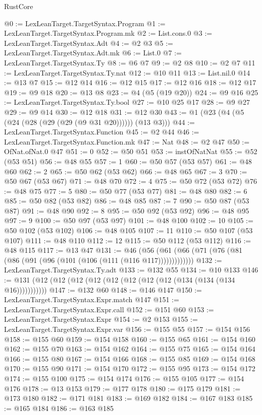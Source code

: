 \begin{lexlean}{RustCore}
\begin{coremodule}
@0 := LexLeanTarget.TargetSyntax.Program
@1 := LexLeanTarget.TargetSyntax.Program.mk
@2 := List.cons.{0}
@3 := LexLeanTarget.TargetSyntax.Adt
@4 := @2 @3
@5 := LexLeanTarget.TargetSyntax.Adt.mk
@6 := List.{0}
@7 := LexLeanTarget.TargetSyntax.Ty
@8 := @6 @7
@9 := @2 @8
@10 := @2 @7
@11 := LexLeanTarget.TargetSyntax.Ty.nat
@12 := @10 @11
@13 := List.nil.{0}
@14 := @13 @7
@15 := @12 @14
@16 := @12 @15
@17 := @12 @16
@18 := @12 @17
@19 := @9 @18
@20 := @13 @8
@23 := @4 (@5 (@19 @20))
@24 := @9 @16
@25 := LexLeanTarget.TargetSyntax.Ty.bool
@27 := @10 @25 @17
@28 := @9 @27
@29 := @9 @14
@30 := @12 @18
@31 := @12 @30
@43 := @1 (@23 (@4 (@5 (@24 (@28 (@29 (@29 (@9 @31 @20)))))) (@13 @3)))
@44 := LexLeanTarget.TargetSyntax.Function
@45 := @2 @44
@46 := LexLeanTarget.TargetSyntax.Function.mk
@47 := Nat
@48 := @2 @47
@50 := OfNat.ofNat.{0} @47
@51 := 0
@52 := @50 @51
@53 := instOfNatNat
@55 := @52 (@53 @51)
@56 := @48 @55
@57 := 1
@60 := @50 @57 (@53 @57)
@61 := @48 @60
@62 := 2
@65 := @50 @62 (@53 @62)
@66 := @48 @65
@67 := 3
@70 := @50 @67 (@53 @67)
@71 := @48 @70
@72 := 4
@75 := @50 @72 (@53 @72)
@76 := @48 @75
@77 := 5
@80 := @50 @77 (@53 @77)
@81 := @48 @80
@82 := 6
@85 := @50 @82 (@53 @82)
@86 := @48 @85
@87 := 7
@90 := @50 @87 (@53 @87)
@91 := @48 @90
@92 := 8
@95 := @50 @92 (@53 @92)
@96 := @48 @95
@97 := 9
@100 := @50 @97 (@53 @97)
@101 := @48 @100
@102 := 10
@105 := @50 @102 (@53 @102)
@106 := @48 @105
@107 := 11
@110 := @50 @107 (@53 @107)
@111 := @48 @110
@112 := 12
@115 := @50 @112 (@53 @112)
@116 := @48 @115
@117 := @13 @47
@131 := @46 (@56 (@61 (@66 (@71 (@76 (@81 (@86 (@91 (@96 (@101 (@106 (@111 (@116 @117)))))))))))))
@132 := LexLeanTarget.TargetSyntax.Ty.adt
@133 := @132 @55
@134 := @10 @133
@146 := @131 (@12 (@12 (@12 (@12 (@12 (@12 (@12 (@12 (@134 (@134 (@134 @16)))))))))))
@147 := @132 @60
@148 := @146 @147
@150 := LexLeanTarget.TargetSyntax.Expr.match @147
@151 := LexLeanTarget.TargetSyntax.Expr.call
@152 := @151 @60
@153 := LexLeanTarget.TargetSyntax.Expr
@154 := @2 @153
@155 := LexLeanTarget.TargetSyntax.Expr.var
@156 := @155 @55
@157 := @154 @156
@158 := @155 @60
@159 := @154 @158
@160 := @155 @65
@161 := @154 @160
@162 := @155 @70
@163 := @154 @162
@164 := @155 @75
@165 := @154 @164
@166 := @155 @80
@167 := @154 @166
@168 := @155 @85
@169 := @154 @168
@170 := @155 @90
@171 := @154 @170
@172 := @155 @95
@173 := @154 @172
@174 := @155 @100
@175 := @154 @174
@176 := @155 @105
@177 := @154 @176
@178 := @13 @153
@179 := @177 @178
@180 := @175 @179
@181 := @173 @180
@182 := @171 @181
@183 := @169 @182
@184 := @167 @183
@185 := @165 @184
@186 := @163 @185

\end{coremodule}
\end{lexlean}
